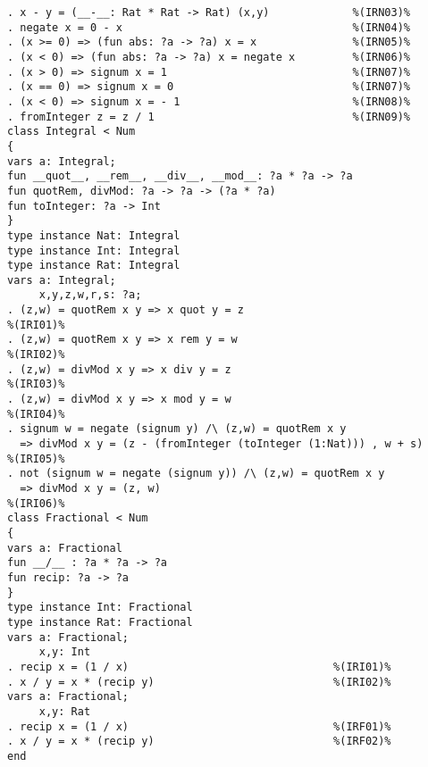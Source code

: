 \begin{Verbatim}
. x - y = (__-__: Rat * Rat -> Rat) (x,y)             %(IRN03)%
. negate x = 0 - x                                    %(IRN04)%
. (x >= 0) => (fun abs: ?a -> ?a) x = x               %(IRN05)%
. (x < 0) => (fun abs: ?a -> ?a) x = negate x         %(IRN06)%
. (x > 0) => signum x = 1                             %(IRN07)%
. (x == 0) => signum x = 0                            %(IRN07)%
. (x < 0) => signum x = - 1                           %(IRN08)%
. fromInteger z = z / 1                               %(IRN09)%
class Integral < Num
{
vars a: Integral;
fun __quot__, __rem__, __div__, __mod__: ?a * ?a -> ?a
fun quotRem, divMod: ?a -> ?a -> (?a * ?a)
fun toInteger: ?a -> Int
}
type instance Nat: Integral
type instance Int: Integral
type instance Rat: Integral
vars a: Integral;
     x,y,z,w,r,s: ?a;
. (z,w) = quotRem x y => x quot y = z                                 %(IRI01)%
. (z,w) = quotRem x y => x rem y = w                                  %(IRI02)%
. (z,w) = divMod x y => x div y = z                                   %(IRI03)%
. (z,w) = divMod x y => x mod y = w                                   %(IRI04)%
. signum w = negate (signum y) /\ (z,w) = quotRem x y                    
  => divMod x y = (z - (fromInteger (toInteger (1:Nat))) , w + s)     %(IRI05)%
. not (signum w = negate (signum y)) /\ (z,w) = quotRem x y              
  => divMod x y = (z, w)                                              %(IRI06)%
class Fractional < Num
{
vars a: Fractional
fun __/__ : ?a * ?a -> ?a
fun recip: ?a -> ?a
}
type instance Int: Fractional
type instance Rat: Fractional
vars a: Fractional;
     x,y: Int
. recip x = (1 / x)                                %(IRI01)%
. x / y = x * (recip y)                            %(IRI02)%
vars a: Fractional;
     x,y: Rat
. recip x = (1 / x)                                %(IRF01)%
. x / y = x * (recip y)                            %(IRF02)%
end
\end{Verbatim}

